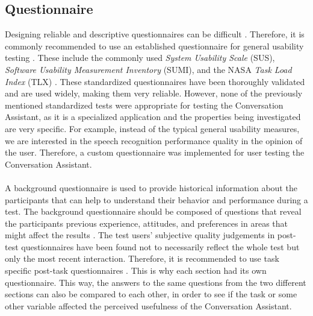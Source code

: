 \documentclass[english, 12pt, a4paper, pdftex, elec, utf8]{aaltothesis}
\begin{document}
\subsection{Questionnaire} \label{sec:quest}

Designing reliable and descriptive questionnaires can be difficult \cite{rubin2008handbook}. Therefore, it is commonly recommended to use an established questionnaire for general usability testing \cite{rubin2008handbook, riihiaho2015}. These include the commonly used \textit{System Usability Scale} (SUS), \textit{Software Usability Measurement Inventory} (SUMI), and the NASA \textit{Task Load Index} (TLX) \cite[p.~37--38]{riihiaho2015}. These standardized questionnaires have been thoroughly validated and are used widely, making them very reliable. However, none of the previously mentioned standardized tests were appropriate for testing the Conversation Assistant, as it is a specialized application and the properties being investigated are very specific. For example, instead of the typical general usability measures, we are interested in the speech recognition performance quality in the opinion of the user. Therefore, a custom questionnaire was implemented for user testing the Conversation Assistant. \\\\
A background questionnaire is used to provide historical information about the participants that can help to understand their behavior and performance during a test. The background questionnaire should be composed of questions that reveal the participants previous experience, attitudes, and preferences in areas that might affect the results \cite[p.~162]{rubin2008handbook}. The test users' subjective quality judgements in post-test questionnaires have been found not to necessarily reflect the whole test but only the most recent interaction. Therefore, it is recommended to use task specific post-task questionnaires \cite[p.~39]{riihiaho2015}. This is why each section had its own questionnaire. This way, the answers to the same questions from the two different sections can also be compared to each other, in order to see if the task or some other variable affected the perceived usefulness of the Conversation Assistant. \\\\
\end{document}
